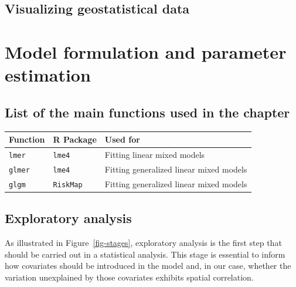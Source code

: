 \documentclass[
  letterpaper,
]{krantz}
\begin{document}
\hypertarget{visualizing-geostatistical-data}{%
\section{Visualizing geostatistical
data}\label{visualizing-geostatistical-data}}

\hypertarget{section}{%
\section{}\label{section}}


\hypertarget{sec-estimation}{%
\chapter{Model formulation and parameter
estimation}\label{sec-estimation}}

\hypertarget{list-of-the-main-functions-used-in-the-chapter}{%
\section*{List of the main functions used in the
chapter}\label{list-of-the-main-functions-used-in-the-chapter}}


\begin{longtable}[]{@{}lll@{}}
\toprule\noalign{}
Function & R Package & Used for \\
\midrule\noalign{}
\endhead
\bottomrule\noalign{}
\endlastfoot
\texttt{lmer} & \texttt{lme4} & Fitting linear mixed models \\
\texttt{glmer} & \texttt{lme4} & Fitting generalized linear mixed
models \\
\texttt{glgm} & \texttt{RiskMap} & Fitting generalized linear mixed
models \\
\end{longtable}

\hypertarget{exploratory-analysis}{%
\section{Exploratory analysis}\label{exploratory-analysis}}

As illustrated in Figure~\ref{fig-stages}, exploratory analysis is the
first step that should be carried out in a statistical analysis. This
stage is essential to inform how covariates should be introduced in the
model and, in our case, whether the variation unexplained by those
covariates exhibits spatial correlation.
\end{document}
